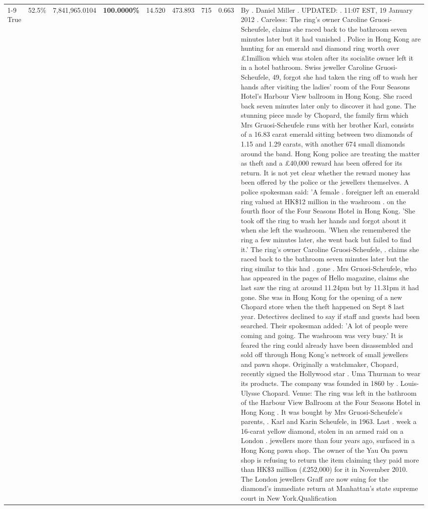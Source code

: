 \begin{table}[H]
\begin{tabular}{lllrlllll}
\cline{1-9}
True & 52.5\% & 7,841,965.0104 & \bfseries \color{red} 100.0000\% & 14.520 & 473.893 & 715 & 0.663 & By . Daniel Miller . UPDATED: . 11:07 EST, 19 January 2012 . Careless: The ring's owner Caroline Gruosi-Scheufele, claims she raced back to the bathroom seven minutes later but it had vanished . Police in Hong Kong are hunting for an emerald and diamond ring worth over £1million which was stolen after its socialite owner left it in a hotel bathroom. Swiss jeweller Caroline Gruosi-Scheufele, 49, forgot she had taken the ring off to wash her hands after visiting the ladies' room of the Four Seasons Hotel's Harbour View ballroom in Hong Kong. She raced back seven minutes later only to discover it had gone. The stunning piece made by Chopard, the family firm which Mrs Gruosi-Scheufele runs with her brother Karl, consists of a 16.83 carat emerald sitting between two diamonds of 1.15 and 1.29 carats, with another 674 small diamonds around the band. Hong Kong police are treating the matter as theft and a £40,000 reward has been offered for its return. It is not yet clear whether the reward money has been offered by the police or the jewellers themselves. A police spokesman said: 'A female . foreigner left an emerald ring valued at HK\$12 million in the washroom . on the fourth floor of the Four Seasons Hotel in Hong Kong. 'She took off the ring to wash her hands and forgot about it when she left the washroom. 'When she remembered the ring a few minutes later, she went back but failed to find it.' The ring's owner Caroline Gruosi-Scheufele, . claims she raced back to the bathroom seven minutes later but the ring similar to this had . gone . Mrs Gruosi-Scheufele, who has appeared in the pages of Hello magazine, claims she last saw the ring at around 11.24pm but by 11.31pm it had gone. She was in Hong Kong for the opening of a new Chopard store when the theft happened on Sept 8 last year. Detectives declined to say if staff and guests had been searched. Their spokesman added: 'A lot of people were coming and going. The washroom was very busy.' It is feared the ring could already have been disassembled and sold off through Hong Kong's network of small jewellers and pawn shops. Originally a watchmaker, Chopard, recently signed the Hollywood star . Uma Thurman to wear its products. The company was founded in 1860 by . Louis-Ulysse Chopard. Venue: The ring was left in the bathroom of the Harbour View Ballroom at the Four Seasons Hotel in Hong Kong . It was bought by Mrs Gruosi-Scheufele's  parents, . Karl and Karin Scheufele, in 1963. Last . week a 16-carat yellow diamond, stolen in an armed raid on a London . jewellers more than four years ago, surfaced in a Hong Kong pawn shop. The owner of the Yau On pawn shop is refusing to return the item claiming they paid more than HK\$3 million (£252,000) for it in November 2010. The London jewellers Graff are now suing for the diamond’s immediate return at Manhattan’s state supreme court in New York.Qualification \\

\end{tabular}
\end{table}

